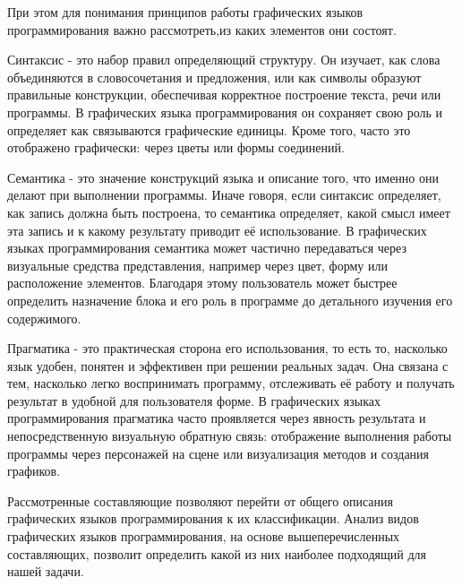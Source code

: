 \documentclass{report}
\begin{document}
\newpage При этом для понимания принципов работы графических языков программирования важно рассмотреть,из каких элементов они состоят.

\begin{enumarabic}
\item Синтаксис - это набор правил определяющий структуру. Он изучает, как слова объединяются в словосочетания и предложения, или как символы образуют правильные конструкции, обеспечивая корректное построение текста, речи или программы. В графических языка программирования он сохраняет свою роль и определяет как связываются графические единицы. Кроме того, часто это отображено графически: через цветы или формы соединений.
\item Семантика - это значение конструкций языка и описание того, что именно они делают при выполнении программы. Иначе говоря, если синтаксис определяет, как запись должна быть построена, то семантика определяет, какой смысл имеет эта запись и к какому результату приводит её использование. В графических языках программирования семантика может частично передаваться через визуальные средства представления, например через цвет, форму или расположение элементов. Благодаря этому пользователь может быстрее определить назначение блока и его роль в программе до детального изучения его содержимого.
\item Прагматика - это практическая сторона его использования, то есть то, насколько язык удобен, понятен и эффективен при решении реальных задач. Она связана с тем, насколько легко воспринимать программу, отслеживать её работу и получать результат в удобной для пользователя форме. В графических языках программирования прагматика часто проявляется через явность результата и непосредственную визуальную обратную связь: отображение выполнения работы программы через персонажей на сцене или визуализация методов и создания графиков.
\end{enumarabic}

Рассмотренные составляющие позволяют перейти от общего описания графических языков программирования к их классификации. Анализ видов графических языков программирования, на основе вышеперечисленных составляющих, позволит определить какой из них наиболее подходящий для нашей задачи.
\end{document}
